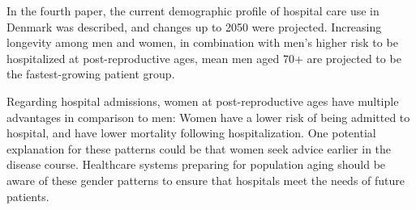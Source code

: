 In the fourth paper, the current demographic profile of hospital care 
use in Denmark was described, and changes up to 2050 were projected. 
Increasing longevity among men and women, in combination with men's 
higher risk to be hospitalized at post-reproductive ages, mean men 
aged 70+ are projected to be the fastest-growing patient group.

Regarding hospital admissions, women at post-reproductive ages have 
multiple advantages in comparison to men: Women have a lower risk of 
being admitted to hospital, and have lower mortality following 
hospitalization. One potential explanation for these patterns could 
be that women seek advice earlier in the disease course. Healthcare 
systems preparing for population aging should be aware of these gender 
patterns to ensure that hospitals meet the needs of future patients.






